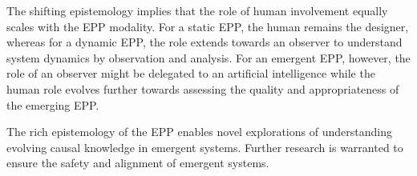 \documentclass{article}
\begin{document}
The shifting epistemology implies that the role of human involvement equally scales with the EPP modality. For a static EPP, the human remains the designer, whereas for a dynamic EPP, the role extends towards an observer to understand system dynamics by observation and analysis. For an emergent EPP, however, the role of an observer might be delegated to an artificial intelligence while the human role evolves further towards assessing the quality and appropriateness of the emerging EPP.

The rich epistemology of the EPP enables novel explorations of understanding evolving causal knowledge in emergent systems. Further research is warranted to ensure the safety and alignment of emergent systems.
 
  
  
\end{document}
